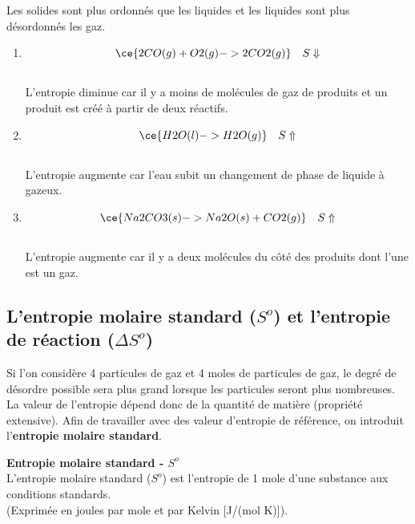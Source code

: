 \documentclass[
  11pt,
  a4paper,
  openany]{book}
\providecommand{\tightlist}{%
  \setlength{\itemsep}{0pt}\setlength{\parskip}{0pt}}
\begin{document}
\begin{Answer}

Les solides sont plus ordonnés que les liquides et les liquides sont plus désordonnés les gaz.

\begin{enumerate}
\def\labelenumi{\alph{enumi}.}
\tightlist
\item
  \[ \ce{2 CO(g) + O2(g) -> 2 CO2(g)} \quad S \Downarrow \]\\
  L'entropie diminue car il y a moins de molécules de gaz de produits et un produit est créé à partir de deux réactifs.
\item
  \[ \ce{H2O(l) -> H2O(g)} \quad S \Uparrow \]\\
  L'entropie augmente car l'eau subit un changement de phase de liquide à gazeux.
\item
  \[ \ce{Na2CO3(s) -> Na2O(s) +CO2(g)} \quad S \Uparrow \]\\
  L'entropie augmente car il y a deux molécules du côté des produits dont l'une est un gaz.
\end{enumerate}

\end{Answer}

\hypertarget{lentropie-molaire-standard-so-et-lentropie-de-ruxe9action-delta-so}{%
\subsection{\texorpdfstring{L'entropie molaire standard (\(S^o\)) et l'entropie de réaction (\(\Delta S^o\))}{L'entropie molaire standard (S\^{}o) et l'entropie de réaction (\textbackslash Delta S\^{}o)}}\label{lentropie-molaire-standard-so-et-lentropie-de-ruxe9action-delta-so}}

Si l'on considère 4 particules de gaz et 4 moles de particules de gaz, le degré de désordre possible sera plus grand lorsque les particules seront plus nombreuses. La valeur de l'entropie dépend donc de la quantité de matière (propriété extensive). Afin de travailler avec des valeur d'entropie de référence, on introduit l'\textbf{entropie molaire standard}.

\begin{tcolorbox}
\textbf{Entropie molaire standard - \(S^o\)}\\
L'entropie molaire standard (\(S^o\)) est l'entropie de 1 mole d'une substance aux conditions standards.\\
(Exprimée en joules par mole et par Kelvin {[}J/(mol K){]}).

\end{tcolorbox}
\end{document}
